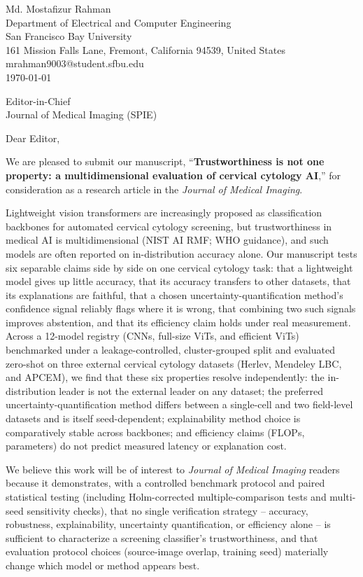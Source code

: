 \documentclass[12pt,letterpaper]{article}
\begin{document}
\begin{flushright}
Md. Mostafizur Rahman\\
Department of Electrical and Computer Engineering\\
San Francisco Bay University\\
161 Mission Falls Lane, Fremont, California 94539, United States\\
mrahman9003@student.sfbu.edu\\[6pt]
\today
\end{flushright}

\bigskip
\noindent Editor-in-Chief\\
Journal of Medical Imaging (SPIE)

\bigskip
\noindent Dear Editor,

\medskip
\noindent We are pleased to submit our manuscript, ``\textbf{Trustworthiness is not one property: a multidimensional evaluation of cervical cytology AI},'' for consideration as a research article in the \textit{Journal of Medical Imaging}.

\medskip
\noindent Lightweight vision transformers are increasingly proposed as classification backbones for automated cervical cytology screening, but trustworthiness in medical AI is multidimensional (NIST AI RMF; WHO guidance), and such models are often reported on in-distribution accuracy alone. Our manuscript tests six separable claims side by side on one cervical cytology task: that a lightweight model gives up little accuracy, that its accuracy transfers to other datasets, that its explanations are faithful, that a chosen uncertainty-quantification method's confidence signal reliably flags where it is wrong, that combining two such signals improves abstention, and that its efficiency claim holds under real measurement. Across a 12-model registry (CNNs, full-size ViTs, and efficient ViTs) benchmarked under a leakage-controlled, cluster-grouped split and evaluated zero-shot on three external cervical cytology datasets (Herlev, Mendeley LBC, and APCEM), we find that these six properties resolve independently: the in-distribution leader is not the external leader on any dataset; the preferred uncertainty-quantification method differs between a single-cell and two field-level datasets and is itself seed-dependent; explainability method choice is comparatively stable across backbones; and efficiency claims (FLOPs, parameters) do not predict measured latency or explanation cost.

\medskip
\noindent We believe this work will be of interest to \textit{Journal of Medical Imaging} readers because it demonstrates, with a controlled benchmark protocol and paired statistical testing (including Holm-corrected multiple-comparison tests and multi-seed sensitivity checks), that no single verification strategy -- accuracy, robustness, explainability, uncertainty quantification, or efficiency alone -- is sufficient to characterize a screening classifier's trustworthiness, and that evaluation protocol choices (source-image overlap, training seed) materially change which model or method appears best.
\end{document}
